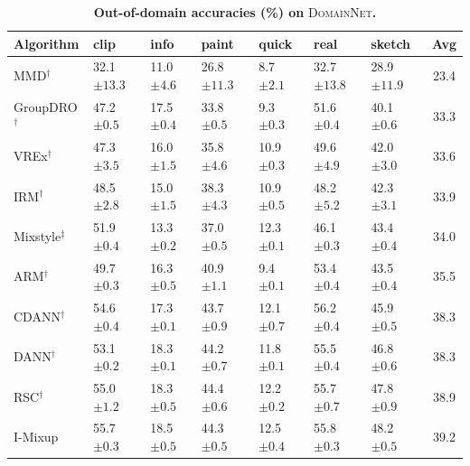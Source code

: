 \documentclass[10pt]{article}
\newcommand{\data}[1]{\textsc{#1}}
\begin{document}
\begin{table}[H]
\centering
\small
\renewcommand{\arraystretch}{1.1}
\caption{\small\textbf{Out-of-domain accuracies (\%) on} \data{DomainNet}\textbf{.}}
\begin{tabular}{lllllll|c}
\toprule
\textbf{Algorithm} & \textbf{clip} & \textbf{info} & \textbf{paint} & \textbf{quick} & \textbf{real} & \textbf{sketch} & \textbf{Avg} \\
\midrule
MMD$^\dagger$ & 32.1 \scriptsize$\pm13.3$ & 11.0 \scriptsize$\pm4.6$ & 26.8 \scriptsize$\pm11.3$ & 8.7 \scriptsize$\pm2.1$ & 32.7 \scriptsize$\pm13.8$ & 28.9 \scriptsize$\pm11.9$ & 23.4 \\
GroupDRO$^\dagger$ & 47.2 \scriptsize$\pm0.5$ & 17.5 \scriptsize$\pm0.4$ & 33.8 \scriptsize$\pm0.5$ & 9.3 \scriptsize$\pm0.3$ & 51.6 \scriptsize$\pm0.4$ & 40.1 \scriptsize$\pm0.6$ & 33.3 \\
VREx$^\dagger$ & 47.3 \scriptsize$\pm3.5$ & 16.0 \scriptsize$\pm1.5$ & 35.8 \scriptsize$\pm4.6$ & 10.9 \scriptsize$\pm0.3$ & 49.6 \scriptsize$\pm4.9$ & 42.0 \scriptsize$\pm3.0$ & 33.6 \\
IRM$^\dagger$ & 48.5 \scriptsize$\pm2.8$ & 15.0 \scriptsize$\pm1.5$ & 38.3 \scriptsize$\pm4.3$ & 10.9 \scriptsize$\pm0.5$ & 48.2 \scriptsize$\pm5.2$ & 42.3 \scriptsize$\pm3.1$ & 33.9 \\
Mixstyle$^\ddagger$ & 51.9 \scriptsize$\pm0.4$ & 13.3 \scriptsize$\pm0.2$ & 37.0 \scriptsize$\pm0.5$ & 12.3 \scriptsize$\pm0.1$ & 46.1 \scriptsize$\pm0.3$ & 43.4 \scriptsize$\pm0.4$ & 34.0 \\
ARM$^\dagger$ & 49.7 \scriptsize$\pm0.3$ & 16.3 \scriptsize$\pm0.5$ & 40.9 \scriptsize$\pm1.1$ & 9.4 \scriptsize$\pm0.1$ & 53.4 \scriptsize$\pm0.4$ & 43.5 \scriptsize$\pm0.4$ & 35.5 \\
CDANN$^\dagger$ & 54.6 \scriptsize$\pm0.4$ & 17.3 \scriptsize$\pm0.1$ & 43.7 \scriptsize$\pm0.9$ & 12.1 \scriptsize$\pm0.7$ & 56.2 \scriptsize$\pm0.4$ & 45.9 \scriptsize$\pm0.5$ & 38.3 \\
DANN$^\dagger$ & 53.1 \scriptsize$\pm0.2$ & 18.3 \scriptsize$\pm0.1$ & 44.2 \scriptsize$\pm0.7$ & 11.8 \scriptsize$\pm0.1$ & 55.5 \scriptsize$\pm0.4$ & 46.8 \scriptsize$\pm0.6$ & 38.3 \\
RSC$^\dagger$ & 55.0 \scriptsize$\pm1.2$ & 18.3 \scriptsize$\pm0.5$ & 44.4 \scriptsize$\pm0.6$ & 12.2 \scriptsize$\pm0.2$ & 55.7 \scriptsize$\pm0.7$ & 47.8 \scriptsize$\pm0.9$ & 38.9 \\
I-Mixup & 55.7 \scriptsize$\pm0.3$ & 18.5 \scriptsize$\pm0.5$ & 44.3 \scriptsize$\pm0.5$ & 12.5 \scriptsize$\pm0.4$ & 55.8 \scriptsize$\pm0.3$ & 48.2 \scriptsize$\pm0.5$ & 39.2 \\

\end{tabular}
\end{table}
\end{document}
